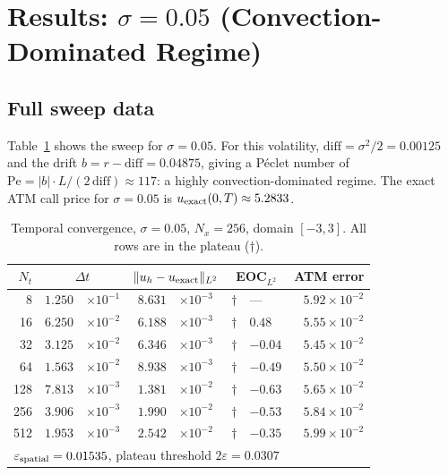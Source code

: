 \documentclass[11pt,a4paper]{article}
\newcommand{\Nx}{N_x}
\newcommand{\Nt}{N_t}
\newcommand{\dt}{\Delta t}
\newcommand{\eps}{\varepsilon}
\begin{document}
\section{Results: \texorpdfstring{$\sigma = 0.05$}{sigma=0.05}
  (Convection-Dominated Regime)}

\subsection{Full sweep data}

Table~\ref{tab:sigma005} shows the sweep for $\sigma=0.05$.
For this volatility, $\mathrm{diff} = \sigma^2/2 = 0.00125$ and
the drift $b = r - \mathrm{diff} = 0.04875$, giving a
P\'{e}clet number of $\mathrm{Pe} = |b| \cdot L/(2\,\mathrm{diff})
\approx 117$: a highly convection-dominated regime.
The exact ATM call price for $\sigma=0.05$ is
$u_{\rm exact}(0,T) \approx 5.2833$.

\begin{table}[htbp]
\centering
\caption{Temporal convergence, $\sigma=0.05$, $\Nx=256$, domain $[-3,3]$.
  All rows are in the plateau ($\dagger$).}
\label{tab:sigma005}
\begin{tabular}{rr@{\;}lr@{\;}lr@{\;}lr}
\toprule
$\Nt$ & \multicolumn{2}{c}{$\dt$}
      & \multicolumn{2}{c}{$\|u_h - u_{\rm exact}\|_{L^2}$}
      & \multicolumn{2}{c}{EOC$_{L^2}$}
      & ATM error \\
\midrule
   8 & $1.250$&$\times 10^{-1}$ & $8.631$&$\times 10^{-3}$ &$\dagger$ & --- & $5.92\times10^{-2}$ \\
  16 & $6.250$&$\times 10^{-2}$ & $6.188$&$\times 10^{-3}$ &$\dagger$ & $0.48$ & $5.55\times10^{-2}$ \\
  32 & $3.125$&$\times 10^{-2}$ & $6.346$&$\times 10^{-3}$ &$\dagger$ & $-0.04$ & $5.45\times10^{-2}$ \\
  64 & $1.563$&$\times 10^{-2}$ & $8.938$&$\times 10^{-3}$ &$\dagger$ & $-0.49$ & $5.50\times10^{-2}$ \\
 128 & $7.813$&$\times 10^{-3}$ & $1.381$&$\times 10^{-2}$ &$\dagger$ & $-0.63$ & $5.65\times10^{-2}$ \\
 256 & $3.906$&$\times 10^{-3}$ & $1.990$&$\times 10^{-2}$ &$\dagger$ & $-0.53$ & $5.84\times10^{-2}$ \\
 512 & $1.953$&$\times 10^{-3}$ & $2.542$&$\times 10^{-2}$ &$\dagger$ & $-0.35$ & $5.99\times10^{-2}$ \\
\midrule
\multicolumn{8}{l}{$\eps_{\rm spatial} = 0.01535$, plateau threshold $2\eps = 0.0307$} \\
\bottomrule
\end{tabular}
\end{table}
\end{document}
